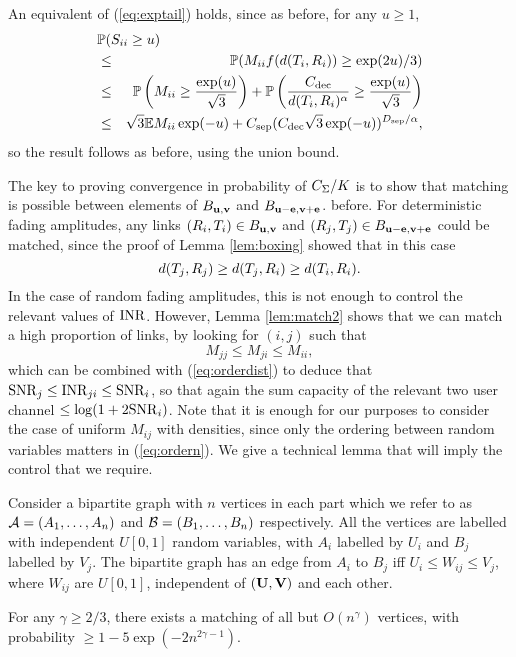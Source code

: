 \documentclass[journal]{IEEEtran}
\begin{document}
\begin{IEEEproof}
An equivalent of (\ref{eq:exptail}) holds, since as before, for any $u \geq 1$,
\begin{eqnarray*}
\lefteqn{ \pr( S_{ii} \geq u) } \\
& \leq & \pr( M_{ii} f(\euc(T_i, R_i)) \geq \exp(2u)/3) \\
& \leq & \pr \left( M_{ii} \geq \frac{\exp(u)}{\sqrt{3}} \right)  +
\pr \left( \frac{\cdec}{\euc(T_i, R_i)^{\alpha}} \geq \frac{\exp(u)}{\sqrt{3}} 
\right) \\
& \leq & \sqrt{3} \ep M_{ii} \exp(-u) + \csep (\cdec \sqrt{3}
\exp(-u))^{\dsep/\alpha},
\end{eqnarray*}
so the result follows as before, using the union bound.
\end{IEEEproof}
%
The key to proving convergence in probability of $C_{\Sigma}/K$ is to show that
matching is possible between elements of $B_{{\mathbf{ u}},{\mathbf{ v}}}$ and $B_{{\mathbf{ u-e}},{\mathbf{ v+e}}}$.
before. For deterministic fading amplitudes, 
any links $(R_i,T_i) \in B_{{\mathbf{ u}},{\mathbf{ v}}}$
and $(R_j,T_j) \in B_{{\mathbf{ u-e}},{\mathbf{ v+e}}}$ could be matched, since the proof of 
Lemma \ref{lem:boxing} showed that in this case
\begin{equation} \label{eq:orderdist}
d(T_j, R_j) \geq d(T_j, R_i) \geq d( T_i, R_i).
\end{equation}
In the case of random fading amplitudes, this is not enough to control the relevant values of
${\rm{INR}}$. However, Lemma \ref{lem:match2} shows that we
can match a high proportion of links, by looking for $(i,j)$
such that
\begin{equation} \label{eq:ordern}
M_{jj} \leq M_{ji} \leq M_{ii},
\end{equation}
which can be combined with (\ref{eq:orderdist}) to deduce that ${\rm{SNR}}_j
\leq {\rm{INR}}_{ji} \leq {\rm{SNR}}_i$, so that again the sum capacity of the relevant two user
channel $\leq \log(1 + 2 {\rm{SNR}}_i)$. Note that it is enough for our purposes to consider the 
case of uniform $M_{ij}$ with densities, since only the ordering between random
variables matters in (\ref{eq:ordern}).  We give a technical lemma that will imply the control that we require.
%
\begin{lemma} \label{lem:match2}
Consider a bipartite graph with $n$ vertices in each part
which we refer to as ${\mathcal{A}} = (A_1, \ldots, A_n)$ and ${\mathcal{B}} = (B_1, \ldots, B_n)$ 
respectively. All the vertices are labelled with independent $U[0,1]$ random 
variables, with
$A_i$ labelled by $U_i$ and $B_j$ labelled by $V_j$. The bipartite
graph has an edge from
$A_i$ to $B_j$ iff $U_i \leq W_{ij} \leq V_j$, where $W_{ij}$ are $U[0,1]$, 
independent of $({\mathbf{ U}},{\mathbf{ V}})$ and each other.

For any $\gamma \geq 2/3$,
there exists a matching of all but $O(n^{\gamma})$  vertices, with probability
$\geq 1 - 5 \exp( -2n^{2 \gamma -1})$.
\end{lemma}
\end{document}
